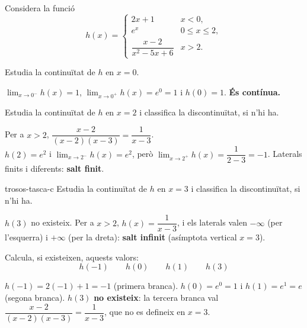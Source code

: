 Considera la funció
\[
h(x)=\begin{cases}
  2x+1 & \si{x<0},\\[3pt]
  e^{x} & \si{0\le x\le 2},\\[3pt]
  \dfrac{x-2}{x^2-5x+6} & \si{x>2}.
\end{cases}
\]

\begin{apartats}

\begin{nomesllarg}
Estudia la continuïtat de $h$ en $x=0$.

\begin{solucio}
$\lim_{x\to0^-}h(x)=1$, $\lim_{x\to0^+}h(x)=e^0=1$ i $h(0)=1$. \textbf{És contínua.}
\end{solucio}
\end{nomesllarg}

Estudia la continuïtat de $h$ en $x=2$ i classifica la discontinuïtat, si n'hi ha.

\begin{solucio}
Per a $x>2$, $\dfrac{x-2}{(x-2)(x-3)}=\dfrac{1}{x-3}$.\\
$h(2)=e^2$ i $\lim_{x\to2^-}h(x)=e^2$, però $\lim_{x\to2^+}h(x)=\dfrac{1}{2-3}=-1$.
Laterals finits i diferents: \textbf{salt finit}.
\end{solucio}

\begin{tria}{trosos-tasca-c}
Estudia la continuïtat de $h$ en $x=3$ i classifica la discontinuïtat, si n'hi ha.

\begin{solucio}
$h(3)$ no existeix. Per a $x>2$, $h(x)=\dfrac{1}{x-3}$, i els laterals valen
$-\infty$ (per l'esquerra) i $+\infty$ (per la dreta): \textbf{salt infinit} (asímptota
vertical $x=3$).
\end{solucio}

Calcula, si existeixen, aquests valors:
\[
h(-1) \qquad h(0) \qquad h(1) \qquad h(3)
\]

\begin{solucio}
$h(-1)=2(-1)+1=-1$ (primera branca). $h(0)=e^0=1$ i $h(1)=e^1=e$ (segona branca).
$h(3)$ \textbf{no existeix}: la tercera branca val $\dfrac{x-2}{(x-2)(x-3)}=\dfrac1{x-3}$,
que no es defineix en $x=3$.
\end{solucio}
\end{tria}

\end{apartats}
